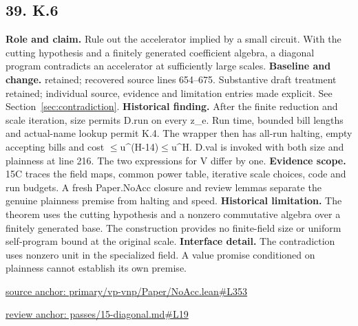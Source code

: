 \documentclass[11pt,letterpaper]{article}
\theoremstyle{definition}\newtheorem{definition}[theorem]{Definition}\newtheorem{example}[theorem]{Example}
\theoremstyle{remark}\newtheorem{remark}[theorem]{Remark}
\begin{document}
\subsection*{39. K.6}
\textbf{Role and claim.} Rule out the accelerator implied by a small circuit. With the cutting hypothesis and a finitely generated coefficient algebra, a diagonal program contradicts an accelerator at sufficiently large scales.
\textbf{Baseline and change.} retained; recovered source lines 654--675. Substantive draft treatment retained; individual source, evidence and limitation entries made explicit. See Section~\ref{sec:contradiction}.
\textbf{Historical finding.} After the finite reduction and scale iteration, size permits D.run on every z\_e. Run time, bounded bill lengths and actual-name lookup permit K.4. The wrapper then has all-run halting, empty accepting bills and cost \ensuremath{\le}u\textasciicircum{}(H-14)\ensuremath{\le}u\textasciicircum{}H. D.val is invoked with both size and plainness at line 216. The two expressions for V differ by one.
\textbf{Evidence scope.} 15C traces the field maps, common power table, iterative scale choices, code and run budgets. A fresh Paper.NoAcc closure and review lemmas separate the genuine plainness premise from halting and speed.
\textbf{Historical limitation.} The theorem uses the cutting hypothesis and a nonzero commutative algebra over a finitely generated base. The construction provides no finite-field size or uniform self-program bound at the original scale.
\textbf{Interface detail.} The contradiction uses nonzero unit in the specialized field. A value promise conditioned on plainness cannot establish its own premise.
\par\href{https://github.com/nousentllc/VP-VNP-Review/blob/8a7976933b6b2b4ffda1ad3a0dfb5fc6b6f023e8/primary/vp-vnp/Paper/NoAcc.lean\#L353}{source anchor: primary/vp-vnp/Paper/NoAcc.lean\#L353}
\par\href{https://github.com/nousentllc/VP-VNP-Review/blob/8a7976933b6b2b4ffda1ad3a0dfb5fc6b6f023e8/passes/15-diagonal.md\#L19}{review anchor: passes/15-diagonal.md\#L19}
\goodbreak
\end{document}
